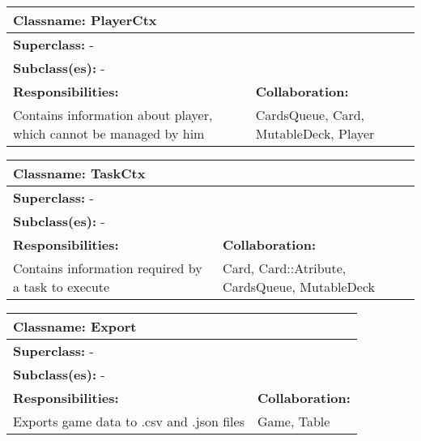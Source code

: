 \documentclass[CCGS.tex]{subfiles}
\begin{document}
\begin{table}[H]
    \centering
    \begin{tabular}{|l|l|}
         \toprule
         \multicolumn{2}{|l|}{\textbf{Classname: }PlayerCtx} \\
         \midrule
         \multicolumn{2}{|l|}{\textbf{Superclass: }-} \\
         \multicolumn{2}{|l|}{\textbf{Subclass(es): }-} \\
         \midrule
         \textbf{Responsibilities:} & \textbf{Collaboration:} \\
         Contains information about player, which cannot be managed by him & CardsQueue, Card, MutableDeck, Player \\
         \bottomrule
    \end{tabular}
    \label{tab:my_label}
\end{table}

\begin{table}[H]
    \centering
    \begin{tabular}{|l|l|}
         \toprule
         \multicolumn{2}{|l|}{\textbf{Classname: }TaskCtx} \\
         \midrule
         \multicolumn{2}{|l|}{\textbf{Superclass: }-} \\
         \multicolumn{2}{|l|}{\textbf{Subclass(es): }-} \\
         \midrule
         \textbf{Responsibilities:} & \textbf{Collaboration:} \\
         Contains information required by a task to execute & Card, Card::Atribute, CardsQueue, MutableDeck \\ 
         \bottomrule
    \end{tabular}
    \label{tab:my_label}
\end{table}

\begin{table}[H]
    \centering
    \begin{tabular}{|l|l|}
         \toprule
         \multicolumn{2}{|l|}{\textbf{Classname: }Export} \\
         \midrule
         \multicolumn{2}{|l|}{\textbf{Superclass: }-} \\
         \multicolumn{2}{|l|}{\textbf{Subclass(es): }-} \\
         \midrule
         \textbf{Responsibilities:} & \textbf{Collaboration:} \\
         Exports game data to .csv and .json files & Game, Table \\ 
         \bottomrule
    \end{tabular}
    \label{tab:my_label}
\end{table}
\end{document}
